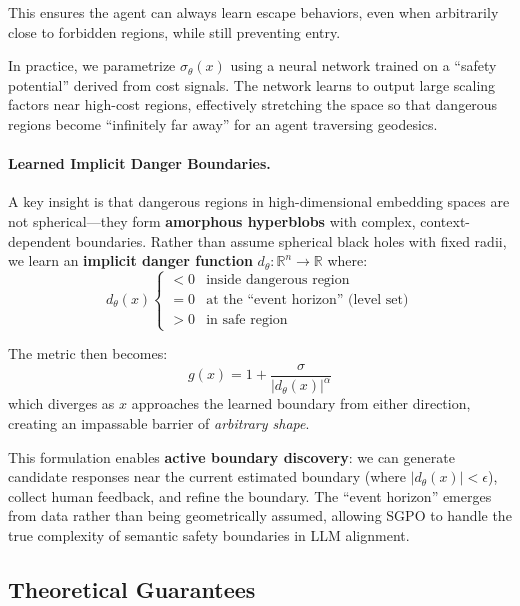 This ensures the agent can always learn escape behaviors, even when arbitrarily close to forbidden regions, while still preventing entry.

In practice, we parametrize $\sigma_\theta(x)$ using a neural network trained on a ``safety potential'' derived from cost signals. The network learns to output large scaling factors near high-cost regions, effectively stretching the space so that dangerous regions become ``infinitely far away'' for an agent traversing geodesics.

\paragraph{Learned Implicit Danger Boundaries.}
A key insight is that dangerous regions in high-dimensional embedding spaces are not spherical---they form \textbf{amorphous hyperblobs} with complex, context-dependent boundaries. Rather than assume spherical black holes with fixed radii, we learn an \textbf{implicit danger function} $d_\theta: \mathbb{R}^n \to \mathbb{R}$ where:
\begin{equation}
d_\theta(x) \begin{cases}
< 0 & \text{inside dangerous region} \\
= 0 & \text{at the ``event horizon'' (level set)} \\
> 0 & \text{in safe region}
\end{cases}
\label{eq:implicit_danger}
\end{equation}

The metric then becomes:
\begin{equation}
g(x) = 1 + \frac{\sigma}{|d_\theta(x)|^\alpha}
\label{eq:implicit_metric}
\end{equation}
which diverges as $x$ approaches the learned boundary from either direction, creating an impassable barrier of \textit{arbitrary shape}.

This formulation enables \textbf{active boundary discovery}: we can generate candidate responses near the current estimated boundary (where $|d_\theta(x)| < \epsilon$), collect human feedback, and refine the boundary. The ``event horizon'' emerges from data rather than being geometrically assumed, allowing SGPO to handle the true complexity of semantic safety boundaries in LLM alignment.

\subsection{Theoretical Guarantees}

